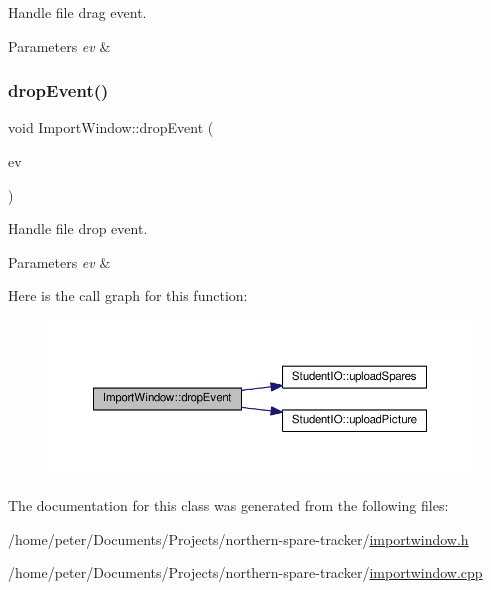 Handle file drag event. 


\begin{DoxyParams}{Parameters}
{\em ev} & \\
\hline
\end{DoxyParams}
\mbox{\label{class_import_window_af10cc2faf3a23226557d3e03d313bb53}} 
\subsubsection{\texorpdfstring{drop\+Event()}{dropEvent()}}
{\footnotesize\ttfamily void Import\+Window\+::drop\+Event (\begin{DoxyParamCaption}\item[{Q\+Drop\+Event $\ast$}]{ev }\end{DoxyParamCaption})\hspace{0.3cm}{\ttfamily [protected]}}



Handle file drop event. 


\begin{DoxyParams}{Parameters}
{\em ev} & \\
\hline
\end{DoxyParams}
Here is the call graph for this function\+:
\nopagebreak
\begin{figure}[H]
\begin{center}
\leavevmode
\includegraphics[width=350pt]{class_import_window_af10cc2faf3a23226557d3e03d313bb53_cgraph}
\end{center}
\end{figure}


The documentation for this class was generated from the following files\+:\begin{DoxyCompactItemize}
\item 
/home/peter/\+Documents/\+Projects/northern-\/spare-\/tracker/\hyperlink{importwindow_8h}{importwindow.\+h}\item 
/home/peter/\+Documents/\+Projects/northern-\/spare-\/tracker/\hyperlink{importwindow_8cpp}{importwindow.\+cpp}\end{DoxyCompactItemize}
